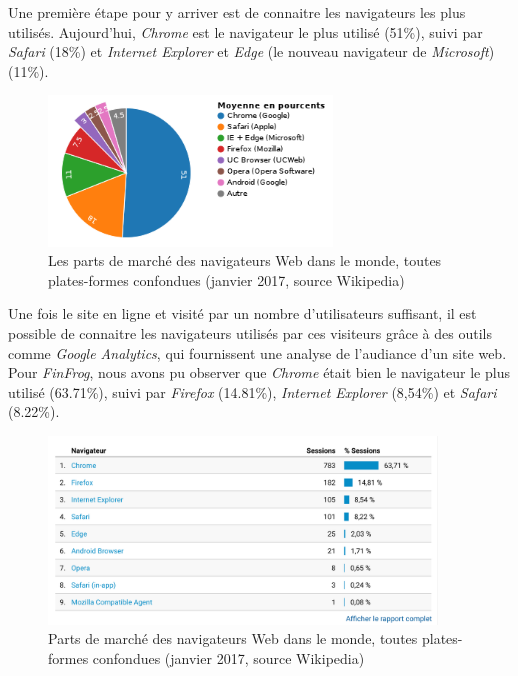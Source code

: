 \documentclass[12pt,a4paper]{article}
\begin{document}
  \bigskip

  Une première étape pour y arriver est de connaitre les navigateurs les
  plus utilisés. Aujourd'hui, \emph{Chrome} est le navigateur le plus
  utilisé (51\%), suivi par \emph{Safari} (18\%) et \emph{Internet
  Explorer} et \emph{Edge} (le nouveau navigateur de \emph{Microsoft})
  (11\%).

  \begin{figure}[h]
    \centering
    \includegraphics[height=4cm]{figures/browsers.png}
    \caption{Les parts de marché des navigateurs Web dans le monde, toutes plates-formes confondues (janvier 2017, source Wikipedia)}
  \end{figure}

  \bigskip

  Une fois le site en ligne et visité par un nombre d'utilisateurs
  suffisant, il est possible de connaitre les navigateurs utilisés par ces
  visiteurs grâce à des outils comme \emph{Google Analytics}, qui
  fournissent une analyse de l'audiance d'un site web. Pour
  \emph{FinFrog}, nous avons pu observer que \emph{Chrome} était bien le
  navigateur le plus utilisé (63.71\%), suivi par \emph{Firefox}
  (14.81\%), \emph{Internet Explorer} (8,54\%) et \emph{Safari} (8.22\%).

  \begin{figure}[h]
    \centering
    \includegraphics[height=5cm]{figures/FF-browsers.png}
    \caption{Parts de marché des navigateurs Web dans le monde, toutes plates-formes confondues (janvier 2017, source Wikipedia)}
  \end{figure}
\end{document}
